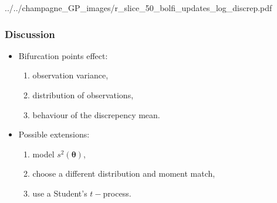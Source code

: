\documentclass{beamer}
\begin{document}
\begin{frame}
{{            ../../champagne_GP_images/r_slice_50_bolfi_updates_log_discrep.pdf}}
\end{frame}

\begin{frame}
    \frametitle{Discussion}
    \begin{itemize}
        \item Bifurcation points effect:
              \begin{enumerate}
                  \item observation variance,
                  \item distribution of observations,
                  \item behaviour of the discrepency mean.
              \end{enumerate}
        \item Possible extensions:
              \begin{enumerate}
                  \item <2-> model $s^2(\bm{\theta})$,
                  \item <3-> choose a different distribution and moment match,
                  \item <4-> use a Student's $t-$process.
              \end{enumerate}
    \end{itemize}
\end{frame}
\end{document}
